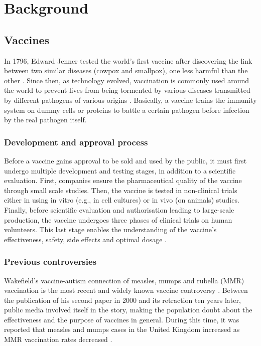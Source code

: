 \chapter{Background}

\section{Vaccines}

In 1796, Edward Jenner tested the world's first vaccine after discovering the link between two similar diseases (cowpox and smallpox), one less harmful than the other \cite{clem_fundamentals_2011}. Since then, as technology evolved, vaccination is commonly used around the world to prevent lives from being tormented by various diseases transmitted by different pathogens of various origins \cite{woolhouse_host_2005}. Basically, a vaccine trains the immunity system on dummy cells or proteins to battle a certain pathogen before infection by the real pathogen itself.

\subsection{Development and approval process}
\label{vaccine_development_approval_process}
Before a vaccine gains approval to be sold and used by the public, it must first undergo multiple development and testing stages, in addition to a scientific evaluation. First, companies ensure the pharmaceutical quality of the vaccine through small scale studies. Then, the vaccine is tested in non-clinical trials either in using in vitro (e.g., in cell cultures) or in vivo (on animals) studies. Finally, before scientific evaluation and authorisation leading to large-scale production, the vaccine undergoes three phases of clinical trials on human volunteers. This last stage enables the understanding of the vaccine's effectiveness, safety, side effects and optimal dosage \cite{ema_covid-19_2020}.

\subsection{Previous controversies}
Wakefield's vaccine-autism connection of measles, mumps and rubella (MMR) vaccination is the most recent and widely known vaccine controversy \cite{flaherty_vaccine-autism_2011}. Between the publication of his second paper in 2000 and its retraction ten years later, public media involved itself in the story, making the population doubt about the effectiveness and the purpose of vaccines in general. During this time, it was reported that measles and mumps cases in the United Kingdom increased as MMR vaccination rates decreased \cite{uk_hsa_measles_2022, phe_dhsd_vaccination_rates_2011}.

